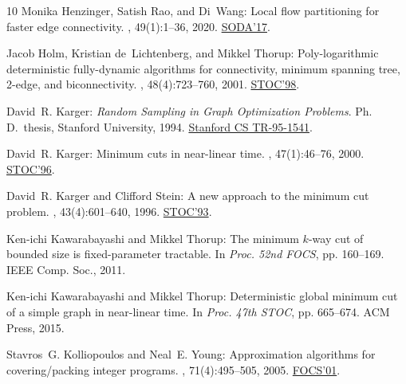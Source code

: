 \documentclass[11pt]{article}
\numberwithin{equation}{section}
\theoremstyle{definition}
\theoremstyle{plain}
\begin{document}
\begin{thebibliography}{10}
{\sc Monika Henzinger, Satish Rao, and Di~Wang}: Local flow partitioning for
  faster edge connectivity.
, 49(1):1--36, 2020.
\newblock \prelim \href{https://doi.org/10.1137/1.9781611974782.125}{SODA'17}.

{\sc Jacob Holm, Kristian de~Lichtenberg, and Mikkel Thorup}: Poly-logarithmic
  deterministic fully-dynamic algorithms for connectivity, minimum spanning
  tree, 2-edge, and biconnectivity.
, 48(4):723--760, 2001.
\newblock \prelim \href{https://doi.org/10.1145/276698.276715}{STOC'98}.
\newblock [\epfmtdoi{10.1145/502090.502095}]

{\sc David~R. Karger}: {\em Random Sampling in Graph Optimization Problems}.
\newblock Ph.\,D.\ thesis, Stanford University, 1994.
\newblock
  \href{http://i.stanford.edu/pub/cstr/reports/cs/tr/95/1541/CS-TR-95-1541.pdf}{Stanford
  CS TR-95-1541}.

{\sc David~R. Karger}: Minimum cuts in near-linear time.
, 47(1):46--76, 2000.
\newblock \prelim \href{https://doi.org/10.1145/237814.237829}{STOC'96}.

{\sc David~R. Karger and Clifford Stein}: A new approach to the minimum cut
  problem.
, 43(4):601--640, 1996.
\newblock \prelim \href{https://doi.org/10.1145/167088.167281}{STOC'93}.
\newblock [\epfmtdoi{10.1145/234533.234534}]

{\sc Ken{-}ichi Kawarabayashi and Mikkel Thorup}: The minimum $k$-way cut of
  bounded size is fixed-parameter tractable.
\newblock In {\em Proc. 52nd FOCS}, pp. 160--169. IEEE Comp. Soc., 2011.

{\sc Ken{-}ichi Kawarabayashi and Mikkel Thorup}: Deterministic global minimum
  cut of a simple graph in near-linear time.
\newblock In {\em Proc. 47th STOC}, pp. 665--674. ACM Press, 2015.

{\sc Stavros~G. Kolliopoulos and Neal~E. Young}: Approximation algorithms for
  covering/packing integer programs.
, 71(4):495--505, 2005.
\newblock \prelim \href{https://doi.org/10.1109/SFCS.2001.959928}{FOCS'01}.


\end{thebibliography}
\end{document}
